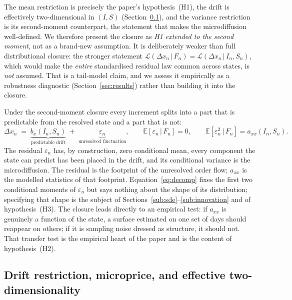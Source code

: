 \documentclass[11pt]{article}
\theoremstyle{plain}
\theoremstyle{definition}
\newcommand{\E}{\mathbb{E}}
\newcommand{\given}{\,\vert\,}
\newcommand{\axx}{a_{xx}}
\begin{document}
\noindent
The mean restriction is precisely the paper's hypothesis~(H1), the drift is
effectively two-dimensional in $(I,S)$ (Section~\ref{sub:drift}), and the variance
restriction is its second-moment counterpart, the statement that makes the
microdiffusion well-defined. We therefore present the closure as \emph{H1 extended to
the second moment}, not as a brand-new assumption. It is deliberately weaker than full
distributional closure: the stronger statement
$\mathcal{L}(\Delta x_n\given F_n)=\mathcal{L}(\Delta x_n\given I_n,S_n)$, which would
make the \emph{entire} standardised residual law common across states, is \emph{not}
assumed. That is a tail-model claim, and we assess it empirically as a robustness
diagnostic (Section~\ref{sec:results}) rather than building it into the closure.

Under the second-moment closure every increment splits into a part that is predictable
from the resolved state and a part that is not:
\begin{equation}
  \Delta x_n \;=\; \underbrace{b_x(I_n,S_n)}_{\text{predictable drift}}
  \;+\; \underbrace{\varepsilon_n}_{\text{unresolved fluctuation}},
  \qquad
  \E[\varepsilon_n \given F_n] = 0,
  \qquad
  \E[\varepsilon_n^2 \given F_n] = \axx(I_n,S_n).
  \label{eq:decomp}
\end{equation}
The residual $\varepsilon_n$ has, by construction, zero conditional mean, every
component the state can predict has been placed in the drift, and its conditional
variance is the microdiffusion. The residual is the footprint of the unresolved order
flow; $\axx$ is the modelled statistics of that footprint.
Equation~\eqref{eq:decomp} fixes the first two conditional moments of
$\varepsilon_n$ but says nothing about the shape of its distribution; specifying that
shape is the subject of Sections~\ref{sub:sde}--\ref{sub:innovation} and of
hypothesis~(H3). The closure leads directly to an empirical test: if $\axx$ is
genuinely a function of the state, a surface estimated on one set of days should
reappear on others; if it is sampling noise dressed as structure, it should not. That
transfer test is the empirical heart of the paper and is the content of
hypothesis~(H2).

\subsection{Drift restriction, microprice, and effective two-dimensionality}
\label{sub:drift}
\end{document}
